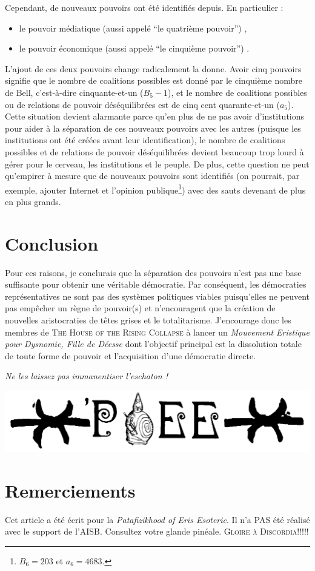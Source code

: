 Cependant, de nouveaux pouvoirs ont été identifiés depuis. En particulier :
\begin{itemize}
\item le pouvoir médiatique (aussi appelé ``le quatrième pouvoir'') \cite{Bourdieu1996, Herman1988},
\item le pouvoir économique (aussi appelé ``le cinquième pouvoir'') \cite{Ramonet1989, Ramonet1996}.
\end{itemize}
L'ajout de ces deux pouvoirs change radicalement la donne. Avoir cinq pouvoirs signifie que le nombre de coalitions possibles est donné par le cinquième nombre de Bell, c'est-à-dire cinquante-et-un ($B_5 -1$), et le nombre de coalitions possibles ou de relations de pouvoir déséquilibrées est de cinq cent quarante-et-un ($a_5$).\\
Cette situation devient alarmante parce qu'en plus de ne pas avoir d'institutions pour aider à la séparation de ces nouveaux pouvoirs avec les autres (puisque les institutions ont été créées avant leur identification), le nombre de coalitions possibles et de relations de pouvoir déséquilibrées devient beaucoup trop lourd à gérer pour le cerveau, les institutions et le peuple. De plus, cette question ne peut qu'empirer à mesure que de nouveaux pouvoirs sont identifiés (on pourrait, par exemple, ajouter Internet et l'opinion publique\footnote{$B_6 = 203$ et $a_6 = 4683$.}) avec des sauts devenant de plus en plus grands.\\

\section*{Conclusion}

Pour ces raisons, je conclurais que la séparation des pouvoirs n'est pas une base suffisante pour obtenir une véritable démocratie. Par conséquent, les démocraties représentatives ne sont pas des systèmes politiques viables puisqu'elles ne peuvent pas empêcher un règne de pouvoir(s) et n'encouragent que la création de nouvelles aristocraties de têtes grises et le totalitarisme. 
J'encourage donc les membres de \textsc{The House of the Rising Collapse} à lancer un \textit{Mouvement Eristique pour Dysnomie, Fille de Déesse} dont l'objectif principal est la dissolution totale de toute forme de pouvoir et l'acquisition d'une démocratie directe.

\begin{center}
\textit{Ne les laissez pas immanentiser l'eschaton !\\}

\includegraphics[scale=0.3]{./img/poee.png}
\end{center}

\section*{Remerciements}
Cet article a été écrit pour la \emph{Patafizikhood of Eris Esoteric}. Il n'a PAS été réalisé avec le support de l'AISB. Consultez votre glande pinéale. \textsc{Gloire à Discordia!!!!!}


